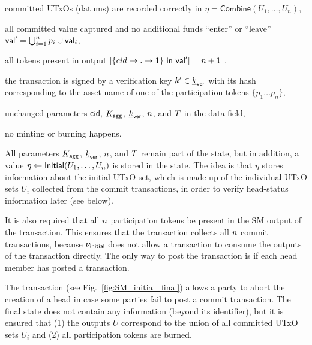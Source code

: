 \begin{menumerate}
  \item committed UTxOs (datums) are recorded correctly in
  $\eta = \mathsf{Combine}(U_{1}, \ldots, U_{n})$,
  \item all committed value captured and no additional funds ``enter'' or ``leave''
  $\mathsf{val}' = \bigcup_{i=1}^{n} p_{i} \cup \mathsf{val}_{i}$,
  \item all tokens present in output
  $|\{cid \rightarrow . \rightarrow 1\} ~ \mathsf{in} ~ \mathsf{val}'| = n + 1$
  ,
  \item the transaction is signed by a verification key $k' \in \underline{k}_{\mathsf{ver}}$ with its
  hash corresponding to the asset name of one of the participation tokens
  $\{p_1 \dots p_n\}$,
  \item unchanged parameters $\mathsf{cid}$, $K_{\mathsf{agg}}$, $\underline{k}_{\mathsf{ver}}$, $n$, and
  $T$ in the data field,
  \item no minting or burning happens.
\end{menumerate}

All parameters $K_{\mathsf{agg}}$, $\underline{k}_{\mathsf{ver}}$, $n$, and $T$ remain part of the state,
but in addition, a value $\eta \gets \mathsf{Initial}(U_1,\ldots,U_n)$ is stored in
the state. The idea is that $\eta$ stores information about the initial UTxO
set, which is made up of the individual UTxO sets $U_i$ collected from the
commit transactions, in order to verify head-status information later (see
below).

It is also required that all $n$ participation tokens be present in the SM
output of the \mtxCollect{} transaction. This ensures that the \mtxCollect{}
transaction collects all $n$ commit transactions, because $\nu_\mathsf{initial}$ does
not allow a \mtxCollect{} transaction to consume the outputs of the \mtxInit{}
transaction directly. The only way to post the \mtxCollect{} transaction is if
each head member has posted a \mtxCommit{} transaction.



 The \mtxAbort{} transaction
(see Fig.~\ref{fig:SM_initial_final}) allows a party to abort the
creation of a head in case some parties fail to post a commit
transaction.  The final state does not contain any information (beyond
its identifier), but it is ensured that (1) the outputs $U$ correspond
to the union of all committed UTxO sets $U_i$ and (2) all
participation tokens are burned.





